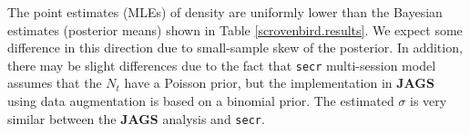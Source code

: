 The point estimates (MLEs) of density are uniformly lower than the
Bayesian estimates (posterior means) shown in Table
\ref{scrovenbird.results}.  We expect some difference in this
direction due to small-sample skew of the posterior.  In addition,
there may be slight differences due to the fact that \mbox{\tt secr}
multi-session model assumes that the $N_{t}$ have a Poisson prior, but
the implementation in {\bf JAGS} using data augmentation is based on a
binomial prior.  The estimated $\sigma$ is very similar between the
{\bf JAGS} analysis and \mbox{\tt secr}.

